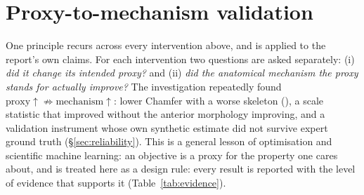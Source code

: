 \section{Proxy-to-mechanism validation}
\label{sec:methodological-discipline}

One principle recurs across every intervention above, and is applied to the
report's own claims. For each intervention two questions are asked
separately: (i) \emph{did it change its intended proxy?} and (ii) \emph{did
the anatomical mechanism the proxy stands for actually improve?} The
investigation repeatedly found $\text{proxy}\uparrow \not\Rightarrow
\text{mechanism}\uparrow$: lower Chamfer with a worse skeleton (), a
scale statistic that improved without the anterior morphology improving,
and a validation instrument whose own synthetic estimate did not survive
expert ground truth (\S\ref{sec:reliability}). This is a general lesson of
optimisation and scientific machine learning: an objective is a proxy for
the property one cares about, and is treated here as a design rule:
every result is reported with the level of evidence that supports it
(Table~\ref{tab:evidence}).
